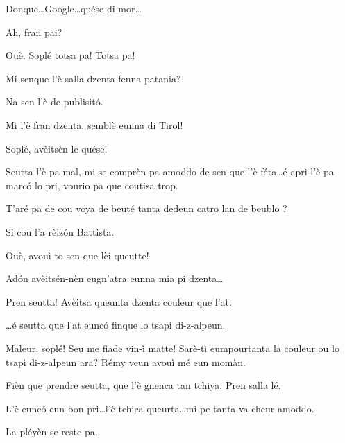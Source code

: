 \begin{drama}
\Remyspeaks{} Donque\ldots Google\ldots quése di mor\ldots

\Cesarspeaks{} Ah, fran pai?

\Remyspeaks Ouè.  Soplé totsa pa! Totsa pa!

\Hermannspeaks Mi senque l'è salla dzenta fenna patania?

\Remyspeaks Na sen l'è de publisit\'o.

\Hermannspeaks Mi l'è fran dzenta, semblè eunna di Tirol!

\Remyspeaks Soplé, avèitsèn le quése!

\Cesarspeaks Seutta l'è pa mal, mi se comprèn pa amoddo de sen que l'è féta\ldots é aprì l'è pa marc\'o lo pri, vourio pa que coutisa trop.

\Battistaspeaks{}  T’aré pa de cou voya de beuté tanta dedeun catro lan de beublo \arrabbiato?

\Hermannspeaks Si cou l’a rèiz\'on Battista.

\Battistaspeaks Ouè, avouì to sen que lèi queutte!


\Cesarspeaks Ad\'on avèitsén-nèn eugn'atra eunna mia pi dzenta\ldots


\Hermannspeaks Pren seutta! Avèitsa queunta dzenta couleur que l'at.

\Battistaspeaks \ldots é seutta que l’at eunc\'o finque lo tsapì di-z-alpeun.

\Cesarspeaks{} Maleur, soplé! Seu me fiade vin-ì matte! Sarè-tì eumpourtanta la couleur ou lo tsapì di-z-alpeun ara? Rémy veun avouì mé eun momàn.


\Cesarspeaks{} Fièn que prendre seut\-ta, que l'è gnenca tan tchiya. Pren salla lé.

\Remyspeaks  L'è eunc\'o eun bon pri\ldots l'è tchica queurta\ldots mi pe tanta va cheur amoddo.

\Battistaspeaks  La pléyèn se reste pa.



\end{drama}
